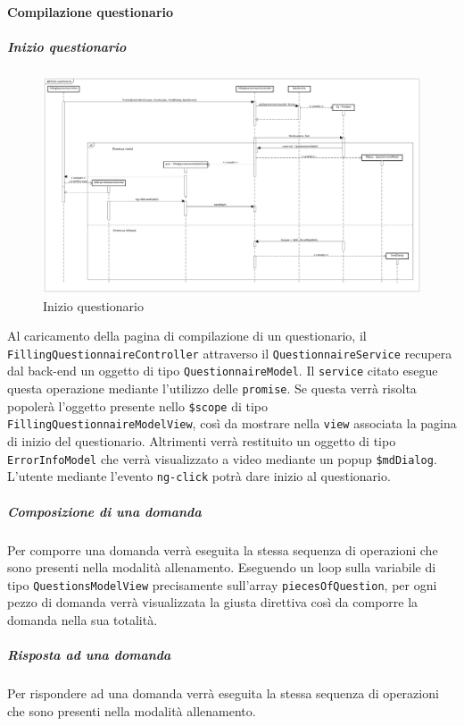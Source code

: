 \paragraph{Compilazione questionario}

\subparagraph{Inizio questionario}

\label{Inizio questionario}

\begin{figure}[ht]
	\centering
	\includegraphics[scale=0.20,keepaspectratio]{UML/DiagrammiDiSequenza/Front-end/Quiz_start.png}
	\caption{Inizio questionario}
\end{figure} \FloatBarrier

Al caricamento della pagina di compilazione di un questionario, il\\ \texttt{FillingQuestionnaireController} attraverso il \texttt{QuestionnaireService} recupera dal back-end un oggetto di tipo \texttt{QuestionnaireModel}. Il \texttt{service} citato esegue questa operazione mediante l'utilizzo delle \texttt{promise}. Se questa verrà risolta popolerà l'oggetto presente nello \texttt{\$scope} di tipo \texttt{FillingQuestionnaireModelView}, così da mostrare nella \texttt{view} associata la pagina di inizio del questionario. Altrimenti verrà restituito un oggetto di tipo \texttt{ErrorInfoModel} che verrà visualizzato a video mediante un popup \texttt{\$mdDialog}. \\
L'utente mediante l'evento \texttt{ng-click} potrà dare inizio al questionario. 

\subparagraph{Composizione di una domanda}

Per comporre una domanda verrà eseguita la stessa sequenza di operazioni che sono presenti nella modalità allenamento. Eseguendo un loop sulla variabile di tipo \texttt{QuestionsModelView} precisamente sull'array \texttt{piecesOfQuestion}, per ogni pezzo di domanda verrà visualizzata la giusta direttiva così da comporre la domanda nella sua totalità.

\subparagraph{Risposta ad una domanda}

Per rispondere ad una domanda verrà eseguita la stessa sequenza di operazioni che sono presenti nella modalità allenamento.


